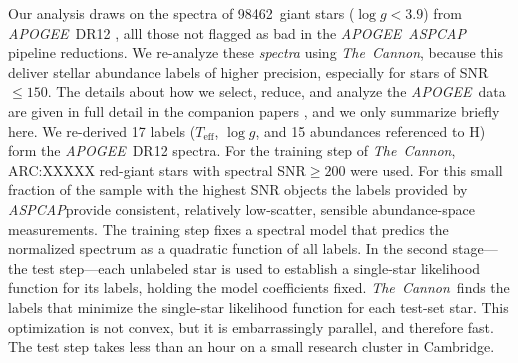 \documentclass[12pt, letterpaper, preprint]{aastex}
\newcommand{\acronym}[1]{{\small{#1}}}
\newcommand{\project}[1]{\textsl{#1}}
\newcommand{\apogee}{\project{\acronym{APOGEE}}}
\newcommand{\aspcap}{\project{\acronym{ASPCAP}}}
\newcommand{\thecannon}{\project{The~Cannon}}
\newcommand{\teff}{T_{\mathrm{eff}}}
\newcommand{\logg}{\log g}
\newcommand{\totalnumber}{98462} %
\begin{document}
Our analysis draws on the spectra of \totalnumber\ giant stars ($\logg
< 3.9$) from \apogee\ \acronym{DR12} \citep{dr12}, alll those not
flagged as bad in the \apogee\ \aspcap\ \citep{aspcap} pipeline
reductions.
We re-analyze these \emph{spectra} using \thecannon, because this
deliver stellar abundance labels of higher precision, especially for
stars of SNR$\le 150$.
The details about how we select, reduce, and analyze the \apogee\ data
are given in full detail in the companion papers \citep{casey16,
  ness16}, and we only summarize briefly here.
We re-derived 17 labels ($\teff$, $\logg$, and 15 abundances
referenced to H) form the \apogee\ \acronym{DR12} spectra. 
For the training step of \thecannon, 
ARC:XXXXX red-giant stars with spectral SNR$\ge 200$ were used.
For this small fraction of the sample with the highest SNR objects the
labels provided by \aspcap provide consistent, relatively low-scatter, sensible
abundance-space measurements.
The training step fixes a spectral model
that predics the normalized spectrum as a quadratic function of all
labels. In the second stage---the test step---each unlabeled star is
used to establish a single-star likelihood function for its labels,
holding the model coefficients fixed.
\thecannon\ finds the labels that minimize the single-star likelihood
function for each test-set star.
This optimization is not convex, but it is embarrassingly parallel,
and therefore fast. The test
step takes less than an hour on a small research cluster in Cambridge.



\end{document}
